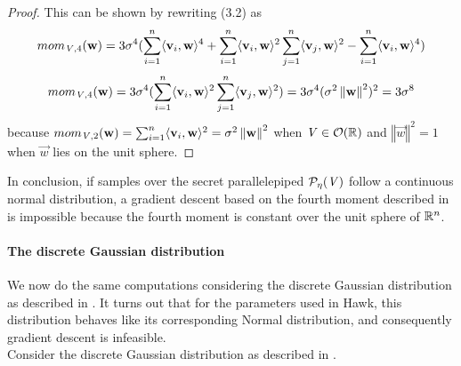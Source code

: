 \begin{proof}
This can be shown by rewriting (3.2) as  
\[ mom_{\mat{V}, 4}(\vec{w}) = 3\sigma^4(\sum_{i=1}^n \langle \vec{v}_i, \vec{w}\rangle^4 + \sum_{i=1}^n \langle \vec{v}_i, \vec{w} \rangle^2 \sum_{j=1}^n \langle \vec{v}_j, \vec{w}\rangle^2 - \sum_{i=1}^n\langle \vec{v}_i, \vec{w}\rangle^4 )\]
\[ mom_{\mat{V}, 4}(\vec{w}) = 3\sigma^4(\sum_{i=1}^n \langle \vec{v}_i, \vec{w}\rangle^2 \sum_{j=1}^n \langle \vec{v}_j, \vec{w}\rangle^2) = 3\sigma^4(\sigma^2\left \Vert \vec{w} \right \Vert^2)^2 = 3\sigma^8\]
because $mom_{\mat{V}, 2}(\vec{w}) = \sum_{i=1}^n \langle \vec{v}_i, \vec{w}\rangle^2 = \sigma^2 \left \Vert \vec{w} \right \Vert^2$ when $\mat{V} \in \mathcal{O}(\bb{R})$ and $\left \Vert \vec{w} \right \Vert^2 = 1$ when $\vec{w}$ lies on the unit sphere.
\end{proof}

In conclusion, if samples over the secret parallelepiped $\PP[\eta]{V}$ follow a continuous normal distribution, a gradient descent based on the fourth moment described in \cite{NR09}
is impossible because the fourth moment is constant over the unit sphere of $\bb{R}^n$.

\paragraph{The discrete Gaussian distribution}
We now do the same computations considering the discrete Gaussian distribution as described in \cite{HawkSpec24}. 
It turns out that for the parameters used in Hawk, this distribution behaves like its corresponding Normal distribution, and consequently gradient descent
is infeasible. \\ 
Consider the discrete Gaussian distribution as described in \cite{HawkSpec24}.
